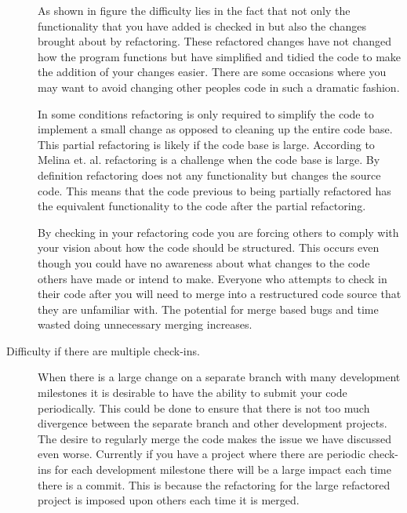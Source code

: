 \begin{description}
    As shown in figure the difficulty lies in the fact that not only the functionality that you have added is checked in but also the changes brought about by refactoring.  These refactored changes have not changed how the program functions but have simplified and tidied the code to make the addition of your changes easier. There are some occasions where you may want to avoid changing other peoples code in such a dramatic fashion.  

    In some conditions refactoring is only required to simplify the code to implement a small change as opposed to cleaning up the entire code base.  This partial refactoring is likely if the code base is large. According to Melina et. al. \cite{Milea2014} refactoring is a challenge when the code base is large. By definition refactoring does not any functionality but changes the source code. This means that the code previous to being partially refactored has the equivalent functionality to the code after the partial refactoring.

    By checking in your refactoring code you are forcing others to comply with your vision about how the code should be structured.  This occurs even though you could have no awareness about what changes to the code others have made or intend to make.  Everyone who attempts to check in their code after you will need to merge into a restructured code source that they are unfamiliar with.  The potential for merge based bugs and time wasted doing unnecessary merging increases.







  \item [Difficulty if there are multiple check-ins.] 
    When there is a large change on a separate branch with many development milestones it is desirable to have the ability to submit your code periodically.  This could be done to ensure that there is not too much divergence between the separate branch and other development projects. The desire to regularly merge the code makes the issue we have discussed even worse. Currently if you have a project where there are periodic check-ins for each development milestone there will be a large impact each time there is a commit. This is because the refactoring for the large refactored project is imposed upon others each time it is merged.


\end{description}
